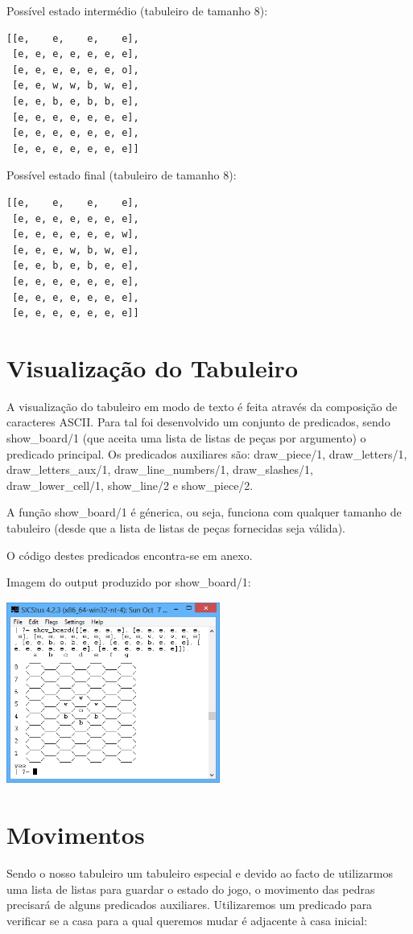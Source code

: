 \documentclass[a4paper]{article}
\begin{document}
Possível estado intermédio (tabuleiro de tamanho 8):
\begin{verbatim}
[[e,    e,    e,    e],
 [e, e, e, e, e, e, e],
 [e, e, e, e, e, e, o],
 [e, e, w, w, b, w, e],
 [e, e, b, e, b, b, e],
 [e, e, e, e, e, e, e],
 [e, e, e, e, e, e, e],
 [e, e, e, e, e, e, e]]
\end{verbatim}

Possível estado final (tabuleiro de tamanho 8):
\begin{verbatim}
[[e,    e,    e,    e],
 [e, e, e, e, e, e, e],
 [e, e, e, e, e, e, w],
 [e, e, e, w, b, w, e],
 [e, e, b, e, b, e, e],
 [e, e, e, e, e, e, e],
 [e, e, e, e, e, e, e],
 [e, e, e, e, e, e, e]]
\end{verbatim}


\section{Visualização do Tabuleiro}
A visualização do tabuleiro em modo de texto é feita através da composição de caracteres ASCII. Para tal foi desenvolvido um conjunto de predicados, sendo show\_board/1 (que aceita uma lista de listas de peças por argumento) o predicado principal. Os predicados auxiliares são: draw\_piece/1, draw\_letters/1, draw\_letters\_aux/1, draw\_line\_numbers/1, draw\_slashes/1, draw\_lower\_cell/1, show\_line/2 e show\_piece/2.

A função show\_board/1 é génerica, ou seja, funciona com qualquer tamanho de tabuleiro (desde que a lista de listas de peças fornecidas seja válida).

O código destes predicados encontra-se em anexo.

Imagem do output produzido por show\_board/1:

\includegraphics[height=6cm, width=7cm]{screenshot.png}

\section{Movimentos}
Sendo o nosso tabuleiro um tabuleiro especial e devido ao facto de utilizarmos uma lista de listas para guardar o estado do jogo, o movimento das pedras precisará de alguns predicados auxiliares.
Utilizaremos um predicado para verificar se a casa para a qual queremos mudar é adjacente à casa inicial:
\end{document}
